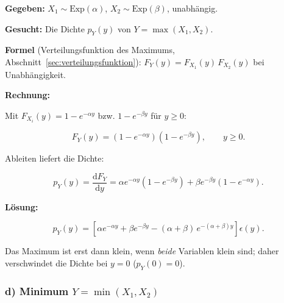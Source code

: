 \begin{beispiel}[Funktion zweier Zufallsvariablen -- $Y = \max(X_1, X_2)$]

\textbf{Gegeben:} $X_1 \sim \text{Exp}(\alpha)$, $X_2 \sim \text{Exp}(\beta)$,
unabhängig.

\textbf{Gesucht:} Die Dichte $p_Y(y)$ von $Y = \max(X_1, X_2)$.

\textbf{Formel} (Verteilungsfunktion des Maximums,
Abschnitt~\ref{sec:verteilungsfunktion}):
$F_Y(y) = F_{X_1}(y)\, F_{X_2}(y)$ bei Unabhängigkeit.

\textbf{Rechnung:}

Mit $F_{X_i}(y) = 1 - e^{-\alpha y}$ bzw. $1 - e^{-\beta y}$ für $y \geq 0$:

$$
F_Y(y) = \left(1 - e^{-\alpha y}\right)\left(1 - e^{-\beta y}\right), \qquad y \geq 0.
$$

Ableiten liefert die Dichte:

$$
p_Y(y) = \frac{\mathrm{d}F_Y}{\mathrm{d}y}
= \alpha e^{-\alpha y}\left(1 - e^{-\beta y}\right)
+ \beta e^{-\beta y}\left(1 - e^{-\alpha y}\right).
$$

\textbf{Lösung:}

$$
\boxed{\;p_Y(y) = \left[\alpha e^{-\alpha y} + \beta e^{-\beta y}
- (\alpha+\beta)\, e^{-(\alpha+\beta) y}\right]\epsilon(y).\;}
$$

Das Maximum ist erst dann klein, wenn \emph{beide} Variablen klein sind; daher
verschwindet die Dichte bei $y = 0$ ($p_Y(0) = 0$).

\end{beispiel}

\subsubsection*{d) Minimum $Y = \min(X_1, X_2)$}

